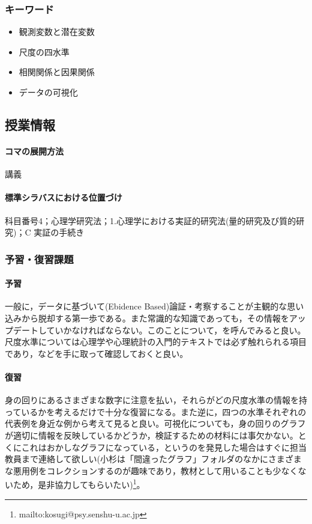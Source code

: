 \subsubsection{キーワード}
\begin{itemize}
	\item 観測変数と潜在変数
	\item 尺度の四水準
	\item 相関関係と因果関係
	\item データの可視化
\end{itemize}
\subsection{授業情報}
\paragraph{コマの展開方法}
講義
\paragraph{標準シラバスにおける位置づけ}
科目番号4；心理学研究法；1.心理学における実証的研究法(量的研究及び質的研究)；C 実証の手続き
\subsubsection{予習・復習課題}
\paragraph{予習}
一般に，データに基づいて(Ebidence Based)論証・考察することが主観的な思い込みから脱却する第一歩である。また常識的な知識であっても，その情報をアップデートしていかなければならない。このことについて，\textcite{Rosling2019}を呼んでみると良い。尺度水準については心理学や心理統計の入門的テキストでは必ず触れられる項目であり，\textcite{Miura201705,Kawabata201408,Yamada2004,kosugi2018,kosugi2019}などを手に取って確認しておくと良い。
\paragraph{復習}
身の回りにあるさまざまな数字に注意を払い，それらがどの尺度水準の情報を持っているかを考えるだけで十分な復習になる。また逆に，四つの水準それぞれの代表例を身近な例から考えて見ると良い。可視化についても，身の回りのグラフが適切に情報を反映しているかどうか，検証するための材料には事欠かない。とくにこれはおかしなグラフになっている，というのを発見した場合はすぐに担当教員まで連絡して欲しい(小杉は「間違ったグラフ」フォルダのなかにさまざまな悪用例をコレクションするのが趣味であり，教材として用いることも少なくないため，是非協力してもらいたい)\footnote{mailto:kosugi@psy.senshu-u.ac.jp}。

